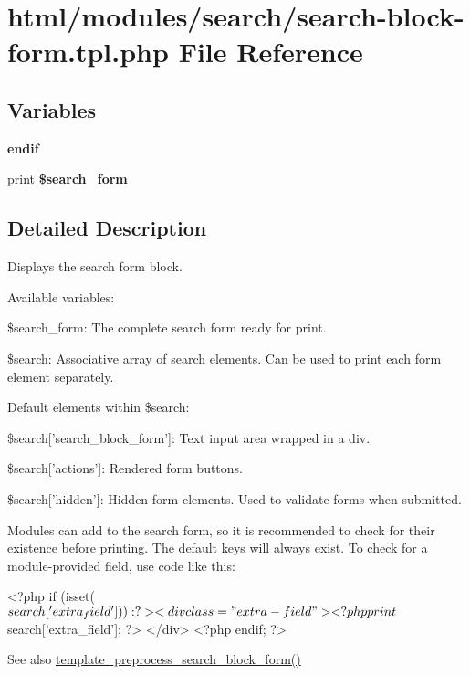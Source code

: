 \hypertarget{search-block-form_8tpl_8php}{
\section{html/modules/search/search-\/block-\/form.tpl.php File Reference}
\label{search-block-form_8tpl_8php}
}
\subsection*{Variables}
\begin{DoxyCompactItemize}
\item 
\hypertarget{search-block-form_8tpl_8php_a82cd33ca97ff99f2fcc5e9c81d65251b}{
{\bfseries endif}}
\label{search-block-form_8tpl_8php_a82cd33ca97ff99f2fcc5e9c81d65251b}

\item 
\hypertarget{search-block-form_8tpl_8php_afd923baf84a0be7eed66628a9497cc0d}{
print {\bfseries \$search\_\-form}}
\label{search-block-form_8tpl_8php_afd923baf84a0be7eed66628a9497cc0d}

\end{DoxyCompactItemize}


\subsection{Detailed Description}
Displays the search form block.

Available variables:
\begin{DoxyItemize}
\item \$search\_\-form: The complete search form ready for print.
\item \$search: Associative array of search elements. Can be used to print each form element separately.
\end{DoxyItemize}

Default elements within \$search:
\begin{DoxyItemize}
\item \$search\mbox{[}'search\_\-block\_\-form'\mbox{]}: Text input area wrapped in a div.
\item \$search\mbox{[}'actions'\mbox{]}: Rendered form buttons.
\item \$search\mbox{[}'hidden'\mbox{]}: Hidden form elements. Used to validate forms when submitted.
\end{DoxyItemize}

Modules can add to the search form, so it is recommended to check for their existence before printing. The default keys will always exist. To check for a module-\/provided field, use code like this: 
\begin{DoxyCode}
   <?php if (isset($search['extra_field'])): ?>
     <div class="extra-field">
       <?php print $search['extra_field']; ?>
     </div>
   <?php endif; ?>
\end{DoxyCode}


\begin{DoxySeeAlso}{See also}
\hyperlink{group__search_ga545a7c7108d985d17d8b8b4054ba66ef}{template\_\-preprocess\_\-search\_\-block\_\-form()} 
\end{DoxySeeAlso}
